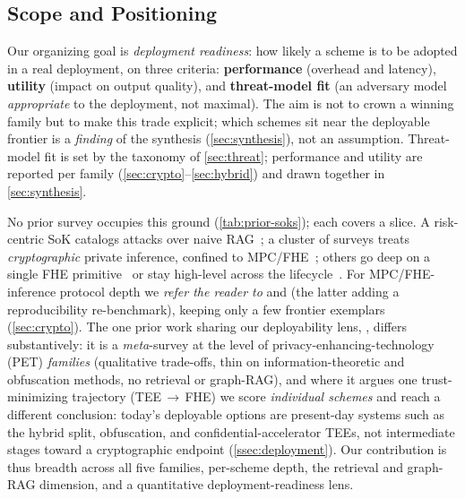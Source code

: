 \subsection{Scope and Positioning}
Our organizing goal is \emph{deployment readiness}: how likely a scheme is to be adopted in
a real deployment, on three criteria: \textbf{performance} (overhead and latency),
\textbf{utility} (impact on output quality), and \textbf{threat-model fit} (an adversary
model \emph{appropriate} to the deployment, not maximal). The aim is not to crown a winning
family but to make this trade explicit; which schemes sit near the deployable frontier is a
\emph{finding} of the synthesis (\cref{sec:synthesis}), not an assumption. Threat-model fit
is set by the taxonomy of \cref{sec:threat}; performance and utility are reported per family
(\cref{sec:crypto}--\cref{sec:hybrid}) and drawn together in \cref{sec:synthesis}.

No prior survey occupies this ground (\cref{tab:prior-soks}); each covers a slice. A
risk-centric SoK catalogs attacks over naive RAG~\citep{bodea_sok}; a cluster of surveys
treats \emph{cryptographic} private inference, confined to
MPC/FHE~\citep{li_pti_survey,luo_cplm_survey,chen_sok_pti}; others go deep on
a single FHE primitive~\citep{xue_fhe_sok,albadawi_ckks_sok} or stay high-level across the
lifecycle~\citep{ma_semantic_sok}. For MPC/FHE-inference protocol depth we \emph{refer the
reader to} \citet{li_pti_survey} and \citet{chen_sok_pti} (the latter
adding a reproducibility re-benchmark), keeping only a few frontier exemplars
(\cref{sec:crypto}). The one prior work sharing our deployability lens,
\citet{andreoletti_ppi_practice}, differs substantively: it is a \emph{meta}-survey at the
level of privacy-enhancing-technology (PET) \emph{families} (qualitative trade-offs, thin on information-theoretic and
obfuscation methods, no retrieval or graph-RAG), and where it argues one trust-minimizing
trajectory (TEE\,$\to$\,FHE) we score \emph{individual schemes} and reach a different
conclusion: today's deployable options are present-day systems such as the hybrid split,
obfuscation, and confidential-accelerator TEEs, not intermediate stages toward a cryptographic
endpoint (\cref{ssec:deployment}). Our contribution is thus breadth across all five families,
per-scheme depth, the retrieval and graph-RAG dimension, and a quantitative
deployment-readiness lens.

